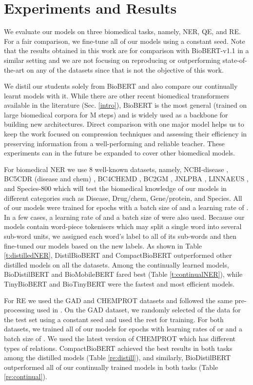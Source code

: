 \documentclass{article}
\begin{document}
\section{Experiments and Results}

We evaluate our models on three biomedical tasks, namely, NER, QE, and RE. For a fair comparison, we fine-tune all of our models using a constant seed. Note that the results obtained in this work are for comparison with BioBERT-v1.1 in a similar setting and we are not focusing on reproducing or outperforming state-of-the-art on any of the datasets since that is not the objective of this work. 

We distil our students solely from BioBERT and also compare our continually learnt models with it. While there are other recent biomedical transformers available in the literature (Sec. \ref{intro}), BioBERT is the most general (trained on large biomedical corpora for M steps) and is widely used as a backbone for building new architectures. Direct comparison with one major model helps us to keep the work focused on compression techniques and assessing their efficiency in preserving information from a well-performing and reliable teacher. These experiments can in the future be expanded to cover other biomedical models.    

For biomedical NER we use 8 well-known datasets, namely, NCBI-disease \citep{dougan2014ncbi}, BC5CDR (disease and chem) \citep{li2016biocreative}, BC4CHEMD \citep{krallinger2015chemdner}, BC2GM \citep{smith2008overview}, JNLPBA \citep{kim2004introduction}, LINNAEUS \citep{gerner2010linnaeus}, and Species-800 \citep{pafilis2013species} which will test the biomedical knowledge of our models in different categories such as Disease, Drug/chem, Gene/protein, and Species. All of our models were trained for  epochs with a batch size of  and a learning rate of . In a few cases, a learning rate of  and a batch size of  were also used. Because our models contain word-piece tokenisers which may split a single word into several sub-word units, we assigned each word's label to all of its sub-words and then fine-tuned our models based on the new labels. As shown in Table \ref{t:distilledNER}, DistilBioBERT and CompactBioBERT outperformed other distilled models on all the datasets. Among the continually learned models, BioDistilBERT and BioMobileBERT fared best (Table \ref{t:continualNER}), while TinyBioBERT and BioTinyBERT were the fastest and most efficient models.

For RE we used the GAD \citep{bravo2015extraction} and CHEMPROT \citep{krallinger2017overview} datasets and followed the same pre-processing used in \citet{lee2020biobert}. On the GAD dataset, we randomly selected  of the data for the test set using a constant seed and used the rest for training. For both datasets, we trained all of our models for  epochs with learning rates of  or  and a batch size of . We used the latest version of CHEMPROT which has  different types of relations. CompactBioBERT achieved the best results in both tasks among the distilled models (Table \ref{re:distill}), and similarly, BioDistilBERT outperformed all of our continually trained models in both tasks (Table \ref{re:continual}). 
\end{document}
